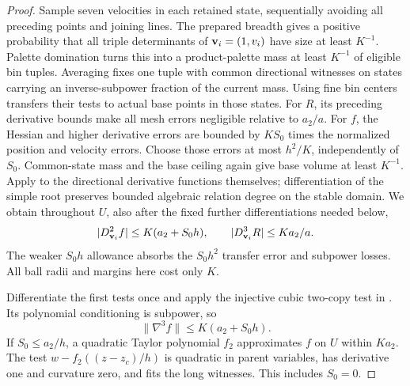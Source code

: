 \begin{proof}
Sample seven velocities in each retained state, sequentially
avoiding all preceding points and joining lines. The prepared
breadth gives a positive probability that all triple determinants
of \({\bf v}_i=(1,v_i)\) have size at least \(K^{-1}\).
Palette domination turns this into a product-palette mass at
least \(K^{-1}\) of eligible bin tuples. Averaging fixes one
tuple with common directional witnesses on states carrying an
inverse-subpower fraction of the current mass.
Using fine bin centers transfers their tests to actual base
points in those states. For \(R\), its preceding derivative
bounds make all mesh errors negligible relative to \(a_2/a\).
For \(f\), the Hessian and higher derivative errors are bounded
by \(KS_0\) times the normalized position and velocity errors.
Choose those errors at most \(h^2/K\), independently of \(S_0\).
Common-state mass and the base ceiling again give base volume
at least \(K^{-1}\). Apply  to the
directional derivative functions themselves; differentiation
of the simple root preserves bounded algebraic relation degree
on the stable domain.
We obtain throughout \(U\), also after the fixed further
differentiations needed below,
\begin{equation}\label{a05:seven-tests}
 |D_{{\bf v}_i}^2f|\leq K(a_2+S_0h),\qquad
 |D_{{\bf v}_i}^3R|\leq Ka_2/a.
\end{equation}
The weaker \(S_0h\) allowance absorbs the \(S_0h^2\) transfer
error and subpower losses.
All ball radii and margins here cost only \(K\).

Differentiate the first tests once and apply the injective
cubic two-copy test in . Its polynomial
conditioning is subpower, so
\begin{equation}\label{a05:third-f}
 \|\nabla^3f\|\leq K(a_2+S_0h).
\end{equation}
If \(S_0\leq a_2/h\), a quadratic Taylor polynomial \(f_2\)
approximates \(f\) on \(U\) within \(Ka_2\).
The test \(w-f_2((z-z_c)/h)\) is quadratic in parent variables,
has derivative one and curvature zero, and fits the long
witnesses. This includes \(S_0=0\).


\end{proof}
